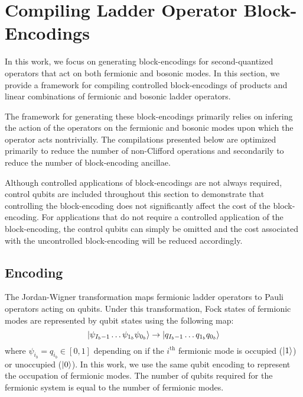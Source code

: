 \section{Compiling Ladder Operator Block-Encodings}
\label{sec:ladder-op-oracles}

In this work, we focus on generating block-encodings for second-quantized operators that act on both fermionic and bosonic modes.
In this section, we provide a framework for compiling controlled block-encodings of products and linear combinations of fermionic and bosonic ladder operators.

The framework for generating these block-encodings primarily relies on infering the action of the operators on the fermionic and bosonic modes upon which the operator acts nontrivially. 
The compilations presented below are optimized primarily to reduce the number of non-Clifford operations and secondarily to reduce the number of block-encoding ancillae.

Although controlled applications of block-encodings are not always required, control qubits are included throughout this section to demonstrate that controlling the block-encoding does not significantly affect the cost of the block-encoding.
For applications that do not require a controlled application of the block-encoding, the control qubits can simply be omitted and the cost associated with the uncontrolled block-encoding will be reduced accordingly.

\subsection{Encoding}
\label{subsec:encoding}

The Jordan-Wigner transformation \cite{jordan-wigner} maps fermionic ladder operators to Pauli operators acting on qubits.
Under this transformation, Fock states of fermionic modes are represented by qubit states using the following map:
\begin{equation}
    \ket{\psi_{{I_b - 1}} \dots \psi_{1_b} \psi_{0_b}} \rightarrow \ket{q_{{I_b - 1}} \dots q_{1_b} q_{0_b}}
\end{equation}
where $\psi_{i_b} = q_{i_b} \in [0, 1]$ depending on if the $i^\text{th}$ fermionic mode is occupied ($\ket{1}$) or unoccupied ($\ket{0}$).
In this work, we use the same qubit encoding to represent the occupation of fermionic modes.
The number of qubits required for the fermionic system is equal to the number of fermionic modes.

